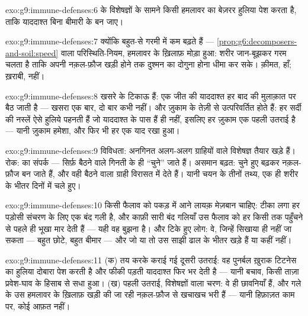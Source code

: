 \begin{solution}{exo:g9:immune-defenses:6}
  के विशेषज्ञों के सामने किसी हमलावर का बेज़रर हुलिया पेश
करता है, ताकि याददाश्त बिना बीमारी के बन जाए।
\end{solution}

\begin{solution}{exo:g9:immune-defenses:7}
क्योंकि बहुत-से  गरमी में कम बढ़ते हैं ---
\cref{prop:g6:decomposers-and-soil:speed} वाला परिस्थिति-नियम, हमलावर के
ख़िलाफ़ मोड़ा हुआ: शरीर जान-बूझकर गरम चलता है ताकि अपनी नक़ल-फ़ौज खड़ी
होने तक दुश्मन का दोगुना होना धीमा कर सके। क़ीमत, हाँ; ख़राबी, नहीं।
\end{solution}

\begin{solution}{exo:g9:immune-defenses:8}
खसरे के  टिकाऊ हैं: एक जीत की याददाश्त हर बाद की मुलाक़ात पर बैठ
जाती है --- खसरा एक बार, दो बार कभी नहीं। और ज़ुकाम के  तेज़ी से
उत्परिवर्तित होते हैं: हर सर्दी की नस्लें ऐसे हुलिये पहनती हैं जो
याददाश्त के पास हैं ही नहीं, इसलिए हर ज़ुकाम एक पहली उतराई है --- यानी
ज़ुकाम हमेशा, और फिर भी हर एक याद रखा हुआ।
\end{solution}

\begin{solution}{exo:g9:immune-defenses:9}
विविधता: अनगिनत अलग-अलग ग्राहियों वाले विशेषज्ञ तैयार खड़े हैं। रोक:
 का संपर्क --- सिर्फ़ बैठने वाले गिनती के ही ``चुने'' जाते हैं।
असमान बढ़त: चुने हुए बढ़कर नक़ल-फ़ौज बन जाते हैं, और वही बैठने वाला ग्राही
विरासत में देते हैं। यानी चयन के तीनों तथ्य, एक ही शरीर के भीतर दिनों में
चले हुए।
\end{solution}

\begin{solution}{exo:g9:immune-defenses:10}
किसी फैलाव को पकड़ में आने लायक़ मेज़बान चाहिए: टीका लगा हर पड़ोसी संचरण
के लिए एक बंद गली है, और काफ़ी सारी बंद गलियाँ उस फैलाव को हर किसी तक
पहुँचने से पहले ही भूखा मार देती हैं --- यही वह बुझना है। और टिके हुए
लोग: वे, जिन्हें सिखाया ही नहीं जा सकता --- बहुत छोटे, बहुत बीमार ---
और जो या तो उस साझी ढाल के भीतर खड़े हैं या कहीं नहीं।
\end{solution}

\begin{solution}{exo:g9:immune-defenses:11}
(क) तय करके कराई गई दूसरी उतराई: वह पुनर्बल ख़ुराक टिटनेस का हुलिया
दोबारा पेश करती है और फीकी पड़ती याददाश्त फिर भर देती है --- यानी बचाव,
किसी ताज़ा प्रवेश-घाव के हिसाब से सधा हुआ। (ख) पहली उतराई, विशेषज्ञों
वाला चरण: वे  ही छावनियाँ हैं, और गले के उस हमलावर के ख़िलाफ़
खड़ी की जा रही नक़ल-फ़ौज से खचाखच भरी हैं --- यानी हिफ़ाज़त काम पर, कोई
आफ़त नहीं।
\end{solution}

